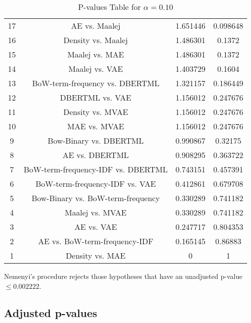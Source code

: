 \documentclass[a4paper,10pt]{article}
\begin{document}
\begin{landscape}
\begin{table}[!htp]
\begin{tabular}{cccc}
17&AE vs. Maalej&1.651446&0.098648\\
16&Density vs. Maalej&1.486301&0.1372\\
15&Maalej vs. MAE&1.486301&0.1372\\
14&Maalej vs. VAE&1.403729&0.1604\\
13&BoW-term-frequency vs. DBERTML&1.321157&0.186449\\
12&DBERTML vs. VAE&1.156012&0.247676\\
11&Density vs. MVAE&1.156012&0.247676\\
10&MAE vs. MVAE&1.156012&0.247676\\
9&Bow-Binary vs. DBERTML&0.990867&0.32175\\
8&AE vs. DBERTML&0.908295&0.363722\\
7&BoW-term-frequency-IDF vs. DBERTML&0.743151&0.457391\\
6&BoW-term-frequency-IDF vs. VAE&0.412861&0.679708\\
5&Bow-Binary vs. BoW-term-frequency&0.330289&0.741182\\
4&Maalej vs. MVAE&0.330289&0.741182\\
3&AE vs. VAE&0.247717&0.804353\\
2&AE vs. BoW-term-frequency-IDF&0.165145&0.86883\\
1&Density vs. MAE&0&1\\
\hline
\end{tabular}
\caption{P-values Table for $\alpha=0.10$}
\end{table}Nemenyi's procedure rejects those hypotheses that have an unadjusted p-value $\le0.002222$.

\pagebreak

\subsection{Adjusted p-values}


\end{landscape}
\end{document}
